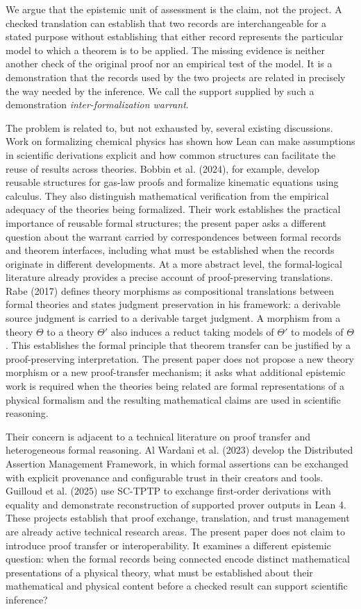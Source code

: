 \documentclass[pdflatex,sn-apa]{sn-jnl}
\begin{document}
We argue that the epistemic unit of assessment is the claim, not the project. A checked translation can establish that two records are interchangeable for a stated purpose without establishing that either record represents the particular model to which a theorem is to be applied. The missing evidence is neither another check of the original proof nor an empirical test of the model. It is a demonstration that the records used by the two projects are related in precisely the way needed by the inference. We call the support supplied by such a demonstration \emph{inter-formalization warrant}.

The problem is related to, but not exhausted by, several existing discussions. Work on formalizing chemical physics has shown how Lean can make assumptions in scientific derivations explicit and how common structures can facilitate the reuse of results across theories. Bobbin et al. (2024), for example, develop reusable structures for gas-law proofs and formalize kinematic equations using calculus. They also distinguish mathematical verification from the empirical adequacy of the theories being formalized. Their work establishes the practical importance of reusable formal structures; the present paper asks a different question about the warrant carried by correspondences between formal records and theorem interfaces, including what must be established when the records originate in different developments. At a more abstract level, the formal-logical literature already provides a precise account of proof-preserving translations. Rabe (2017) defines theory morphisms as compositional translations between formal theories and states judgment preservation in his framework: a derivable source judgment is carried to a derivable target judgment. A morphism from a theory \(\Theta\) to a theory \(\Theta'\) also induces a reduct taking models of \(\Theta'\) to models of \(\Theta\). This establishes the formal principle that theorem transfer can be justified by a proof-preserving interpretation. The present paper does not propose a new theory morphism or a new proof-transfer mechanism; it asks what additional epistemic work is required when the theories being related are formal representations of a physical formalism and the resulting mathematical claims are used in scientific reasoning.

Their concern is adjacent to a technical literature on proof transfer and heterogeneous formal reasoning. Al Wardani et al. (2023) develop the Distributed Assertion Management Framework, in which formal assertions can be exchanged with explicit provenance and configurable trust in their creators and tools. Guilloud et al. (2025) use SC-TPTP to exchange first-order derivations with equality and demonstrate reconstruction of supported prover outputs in Lean 4. These projects establish that proof exchange, translation, and trust management are already active technical research areas. The present paper does not claim to introduce proof transfer or interoperability. It examines a different epistemic question: when the formal records being connected encode distinct mathematical presentations of a physical theory, what must be established about their mathematical and physical content before a checked result can support scientific inference?
\end{document}
